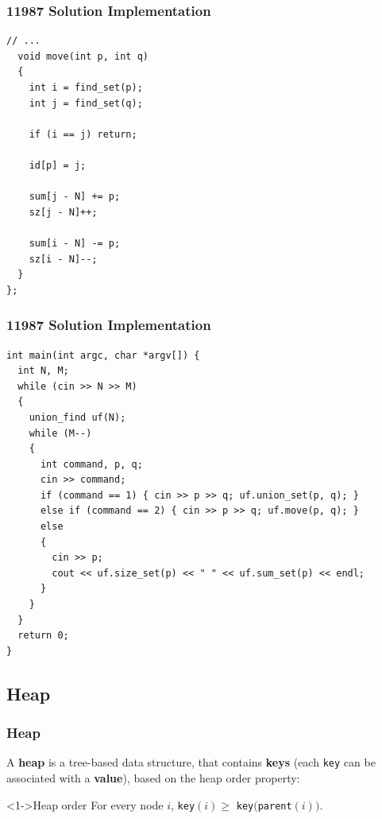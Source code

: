\documentclass{beamer}
\begin{document}
\begin{frame}[containsverbatim]
\frametitle{11987 Solution Implementation}

\scriptsize

\begin{lstlisting}[mathescape]
  // ...
  void move(int p, int q)
  {
    int i = find_set(p);
    int j = find_set(q);

    if (i == j) return;

    id[p] = j;

    sum[j - N] += p;
    sz[j - N]++;

    sum[i - N] -= p;
    sz[i - N]--;
  }
};
\end{lstlisting}

\end{frame}

\begin{frame}[containsverbatim]
\frametitle{11987 Solution Implementation}

\scriptsize

\begin{lstlisting}[mathescape]
int main(int argc, char *argv[]) {
  int N, M;
  while (cin >> N >> M)
  {
    union_find uf(N);
    while (M--)
    {
      int command, p, q;
      cin >> command;
      if (command == 1) { cin >> p >> q; uf.union_set(p, q); }
      else if (command == 2) { cin >> p >> q; uf.move(p, q); }
      else
      {
        cin >> p;
        cout << uf.size_set(p) << " " << uf.sum_set(p) << endl;
      }
    }
  }
  return 0;
}
\end{lstlisting}

\end{frame}

\fi


\subsection{Heap}

\begin{frame}%
\frametitle{Heap}

A \textbf{heap} is a tree-based data structure, that contains \textbf{keys}
(each \texttt{key} can be associated with a \textbf{value}),
based on the heap order property:
\vspace{0.4cm}
\begin{block}<1->{Heap order}
For every node $i$,  \texttt{key}$(i) \ge$ \texttt{key}$($\texttt{parent}$(i))$.
\end{block}
\vspace{0.3cm}

\end{frame}
\end{document}
